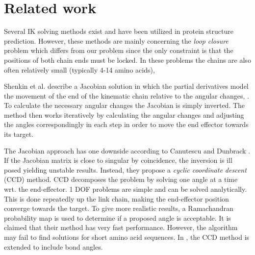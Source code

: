 


\section{Related work}
Several IK solving methods exist and have been utilized in protein
structure prediction.  However, these methods are mainly concerning
the \emph{loop closure} problem \cite{coutsias2004kinematic} which
differs from our problem since the only constraint is that the
positions of both chain ends must be locked. In these problems the
chains are also often relatively small (typically 4-14 amino acids),

  
Shenkin et al. describe a Jacobian solution in which the partial derivatives model the movement of the end of the kinematic chain relative to the angular changes, \cite{shenkin1987}.
To calculate the necessary angular changes the Jacobian is simply inverted.
The method then works iteratively by calculating the angular changes and adjusting the angles correspondingly in each step in order to move the end effector towards its target.

The Jacobian approach has one downside according to Canutescu and Dunbrack
\cite{canutescu2003}.
If the Jacobian matrix is close to singular by coincidence, the inversion is ill posed yielding unstable results.
Instead, they propose a \emph{cyclic coordinate descent} (CCD) method.
CCD decomposes the problem by solving one angle at a time wrt. the end-effector.
1 DOF problems are simple and can be solved analytically.
This is done repeatedly up the link chain, making the end-effector position converge towards the target.
To give more realistic results, a Ramachandran probability map is used to determine if a proposed angle is acceptable. 
It is claimed that their method has very fast performance. 
However, the algorithm may fail to find solutions for short amino acid sequences.
In \cite{boomsma2005full}, the CCD method is extended to include bond angles.

